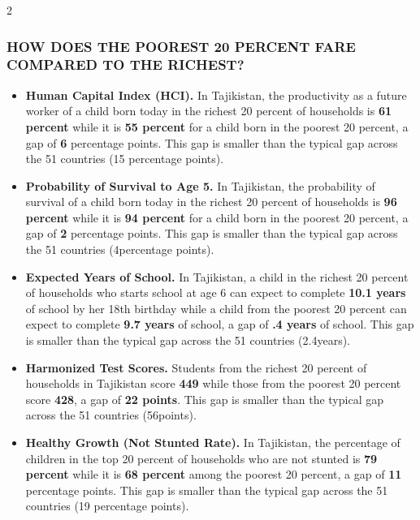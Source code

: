 \documentclass[8pt,]{article}
\begin{document}
\begin {multicols}{2}

\hypertarget{section}{%
\subsubsection{\texorpdfstring{\textcolor{bondiblue}{\textbf{H\small{OW DOES THE POOREST 20 PERCENT FARE COMPARED TO THE RICHEST?}}}}{}}\label{section}}

\begin{itemize}
\item
  \textbf{Human Capital Index (HCI).} In Tajikistan, the productivity as
  a future worker of a child born today in the richest 20 percent of
  households is \textbf{61 percent} while it is \textbf{55 percent} for
  a child born in the poorest 20 percent, a gap of \textbf{6} percentage
  points. This gap is smaller than the typical gap across the 51
  countries (15 percentage points).
\item
  \textbf{Probability of Survival to Age 5.} In Tajikistan, the
  probability of survival of a child born today in the richest 20
  percent of households is \textbf{96 percent} while it is \textbf{94
  percent} for a child born in the poorest 20 percent, a gap of
  \textbf{2} percentage points. This gap is smaller than the typical gap
  across the 51 countries (4percentage points).
\item
  \textbf{Expected Years of School.} In Tajikistan, a child in the
  richest 20 percent of households who starts school at age 6 can expect
  to complete \textbf{10.1 years} of school by her 18th birthday while a
  child from the poorest 20 percent can expect to complete \textbf{9.7
  years} of school, a gap of \textbf{.4 years} of school. This gap is
  smaller than the typical gap across the 51 countries (2.4years).
\item
  \textbf{Harmonized Test Scores.} Students from the richest 20 percent
  of households in Tajikistan score \textbf{449} while those from the
  poorest 20 percent score \textbf{428}, a gap of \textbf{22 points}.
  This gap is smaller than the typical gap across the 51 countries
  (56points).
\item
  \textbf{Healthy Growth (Not Stunted Rate).} In Tajikistan, the
  percentage of children in the top 20 percent of households who are not
  stunted is \textbf{79 percent} while it is \textbf{68 percent} among
  the poorest 20 percent, a gap of \textbf{11} percentage points. This
  gap is smaller than the typical gap across the 51 countries (19
  percentage points).
\end{itemize}


\end{multicols}
\end{document}
